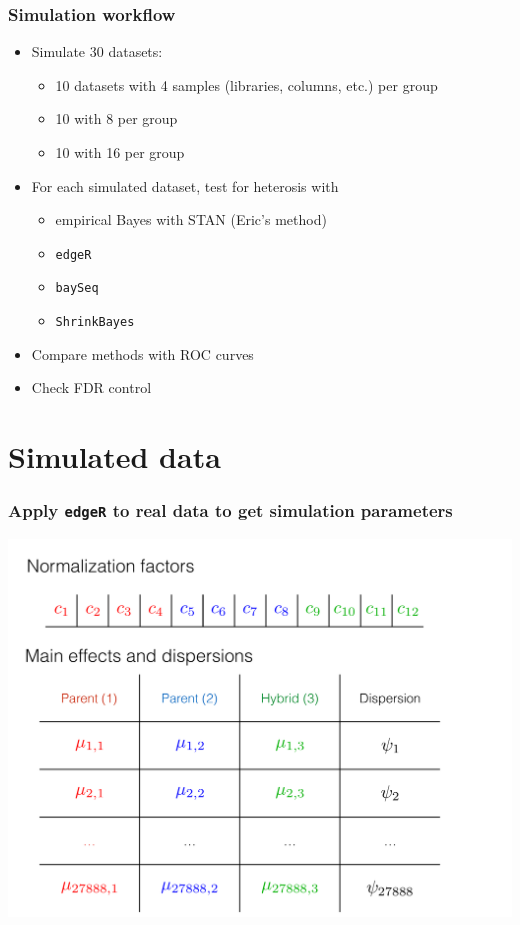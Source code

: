 \documentclass[handout]{beamer}
\numberwithin{equation}{section}
\begin{document}
\begin{frame}
\frametitle{Simulation workflow}

\begin{itemize}
\item Simulate 30 datasets:
\begin{itemize}
\item 10 datasets with 4 samples (libraries, columns, etc.) per group
\item 10 with 8 per group
\item 10 with 16 per group
\end{itemize}
\pause \item For each simulated dataset, test for heterosis with
\begin{itemize}
\item empirical Bayes with STAN (Eric's method)
\item {\tt edgeR} 
\item {\tt baySeq}
\item {\tt ShrinkBayes}
\end{itemize}
\pause \item Compare methods with ROC curves
 \item Check FDR control
\end{itemize}
\end{frame}

\section{Simulated data}


\begin{frame}
\frametitle{Apply {\tt edgeR} to real data to get simulation parameters}
\begin{center}
\includegraphics[scale=.25]{parms}
\end{center}
\end{frame}
\end{document}
